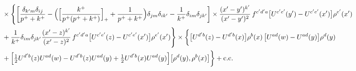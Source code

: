 \documentclass[10pt]{article}
\begin{document}
\begin{align}
&\times\Bigg\{\bigg[\frac{\delta_{k'm}\delta_{ij}}{p^{+}+k^{+}}-\Big(\Big[\frac{k^{+}}{p^{+}(p^{+}+k^{+})}\Big]_{+}+\frac{1}{p^{+}+k^{+}}\Big)\delta_{jm}\delta_{ik'}-\frac{1}{k^{+}}\delta_{im}\delta_{jk'}\bigg]\times\frac{(x'-y')^{k'}}{(x'-y')^{2}}\,f^{c'd'a}\big[U^{c'e'}(y')-U^{c'e'}(x')\big]\rho^{e'}(x')\notag\\
&+\frac{1}{k^{+}}\delta_{im}\delta_{jk'}\frac{(x'-z)^{k'}}{(x'-z)^{2}}\,f^{c'd'a}\big[U^{c'e'}(z)-U^{c'e'}(x')\big]\rho^{e'}(x')\Bigg\}\times\bigg\{\big[U^{d'b}(z)-U^{d'b}(x)\big]\rho^{b}(x)\,\big[U^{ad}(w)-U^{ad}(y)\big]\rho^{d}(y)\notag\\
&+\Big[\tfrac12U^{d'b}(z)U^{ad}(w)-U^{d'b}(z)U^{ad}(y)+\tfrac12U^{d'b}(x)U^{ad}(y)\Big]\big[\rho^{d}(y),\rho^{b}(x)\big]\bigg\}+{\rm c.c.}
\end{align}
\end{document}
